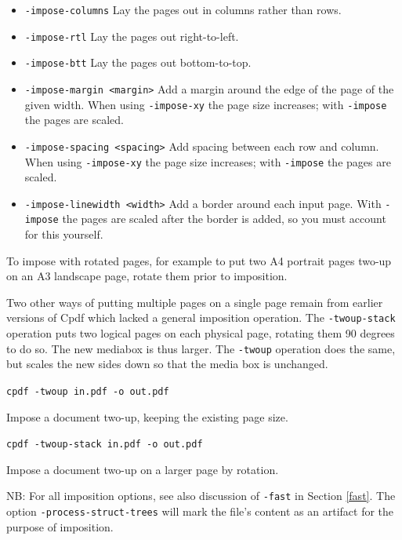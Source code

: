 \documentclass{book}
\begin{document}
\begin{itemize}
\item \texttt{-impose-columns} Lay the pages out in columns rather than rows.
\item \texttt{-impose-rtl} Lay the pages out right-to-left.
\item \texttt{-impose-btt} Lay the pages out bottom-to-top.
\item \texttt{-impose-margin <margin>} Add a margin around the edge of the page of the given width. When using \texttt{-impose-xy} the page size increases; with \texttt{-impose} the pages are scaled.
\item \texttt{-impose-spacing <spacing>} Add spacing between each row and column. When using \texttt{-impose-xy} the page size increases; with \texttt{-impose} the pages are scaled.
\item \texttt{-impose-linewidth <width>} Add a border around each input page. With \texttt{-impose} the pages are scaled after the border is added, so you must account for this yourself.

\end{itemize}

\noindent To impose with rotated pages, for example to put two A4 portrait pages two-up on an A3 landscape page, rotate them prior to imposition.

Two other ways of putting multiple pages on a single page remain from earlier versions of Cpdf which lacked a general imposition operation.  The \texttt{-twoup-stack} operation puts two logical pages on each physical
page, rotating them 90 degrees to do so. The new mediabox is thus larger. The \texttt{-twoup} operation does the same, but scales the new sides down so
that the media box is unchanged.

  \begin{framed}
    \noindent\small\verb!cpdf -twoup in.pdf -o out.pdf!
 
    \vspace{2.5mm}
    \noindent Impose a document two-up, keeping the existing page size.

    \vspace{2.5mm}
    \noindent\small\verb!cpdf -twoup-stack in.pdf -o out.pdf!
 
    \vspace{2.5mm}
    \noindent Impose a document two-up on a larger page by rotation. 
  \end{framed}
 
\noindent NB: For all imposition options, see also discussion of \texttt{-fast} in Section \ref{fast}. The option \texttt{-process-struct-trees} will mark the file's content as an artifact for the purpose of imposition.
\end{document}
